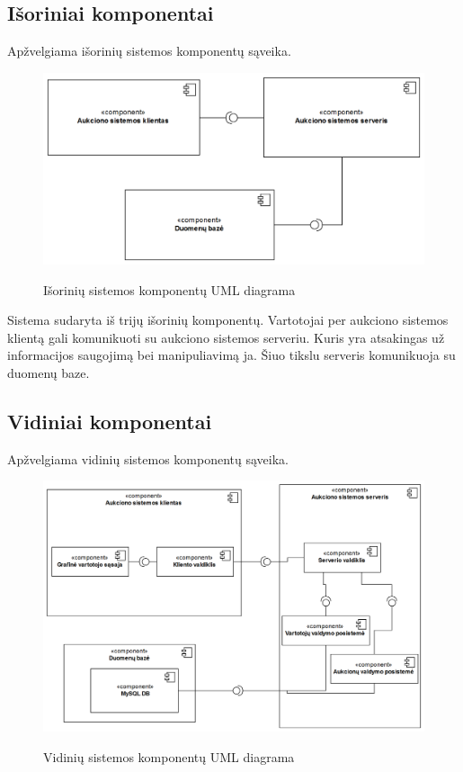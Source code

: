 \documentclass{VUMIFPSkursinis}
\begin{document}
	\subsection{Išoriniai komponentai}
	Apžvelgiama išorinių sistemos komponentų sąveika.
	\begin{figure}[H]
		\centering
		\includegraphics[width=\linewidth]{img/umlComponentDiagramExternal.png}
		\label{fig:aukckoreg}
		\caption{Išorinių sistemos komponentų UML diagrama}
	\end{figure}
	
	Sistema sudaryta iš trijų išorinių komponentų. Vartotojai per aukciono sistemos klientą gali komunikuoti su aukciono sistemos serveriu. Kuris yra atsakingas už informacijos saugojimą bei manipuliavimą ja. Šiuo tikslu serveris komunikuoja su duomenų baze. 
	
	\newpage
	
	\subsection{Vidiniai komponentai}
	Apžvelgiama vidinių sistemos komponentų sąveika.
	\begin{figure}[H]
		\centering
		\includegraphics[width=\linewidth]{img/umlComponentDiagram.png}
		\label{fig:aukckoreg}
		\caption{Vidinių sistemos komponentų UML diagrama}
	\end{figure}
	
\end{document}
